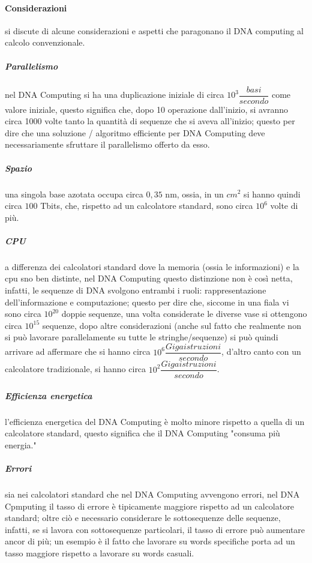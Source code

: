 \documentclass[12pt,a4paper]{report}
\begin{document}
\paragraph{Considerazioni}
si discute di alcune considerazioni e aspetti che paragonano il DNA computing al calcolo convenzionale.

\subparagraph{Parallelismo}
nel  DNA Computing si ha una duplicazione iniziale di circa $10^{3} \dfrac{basi}{secondo}$ come valore iniziale, questo significa che, dopo 10 operazione dall'inizio, si avranno circa 1000 volte tanto la quantità di sequenze che si aveva all'inizio; questo per dire che una soluzione / algoritmo  efficiente per DNA Computing deve necessariamente sfruttare il parallelismo offerto da esso.

\subparagraph{Spazio}
una singola base azotata occupa circa $0,35$ nm, ossia, in un $cm^{2}$ si hanno quindi  circa $100$ Tbits, che, rispetto ad un calcolatore standard, sono circa $10^{6}$ volte di più.

\subparagraph{CPU}
a differenza dei calcolatori standard dove la memoria (ossia le informazioni) e la cpu sno ben distinte, nel DNA Computing questo distinzione non è così netta, infatti, le sequenze di DNA svolgono entrambi i ruoli: rappresentazione dell'informazione e computazione; questo per dire che, siccome in una fiala vi sono circa $10^{20}$ doppie sequenze, una volta considerate le diverse vase si ottengono circa $10^{15}$ sequenze, dopo altre considerazioni (anche sul fatto che realmente non si può lavorare parallelamente su tutte le stringhe/sequenze) si può quindi arrivare ad affermare che si hanno circa $10^{6} \dfrac{Gigaistruzioni}{secondo}$, d'altro canto con un calcolatore tradizionale, si hanno circa $10^{2} \dfrac{Gigaistruzioni}{secondo}$.

\subparagraph{Efficienza energetica}
l'efficienza energetica del DNA Computing è molto minore rispetto a quella di un calcolatore standard, questo significa che il DNA Computing "consuma più energia."

\subparagraph{Errori}
sia nei calcolatori standard che nel DNA Computing avvengono errori, nel DNA Cpmputing il tasso di errore è tipicamente maggiore rispetto ad un calcolatore standard; oltre ciò e necessario considerare le sottosequenze delle sequenze, infatti, se si lavora con sottosequenze particolari, il tasso di errore può aumentare ancor di più; un esempio è il fatto che lavorare su words specifiche porta ad un tasso maggiore rispetto a lavorare su words casuali.
\end{document}
